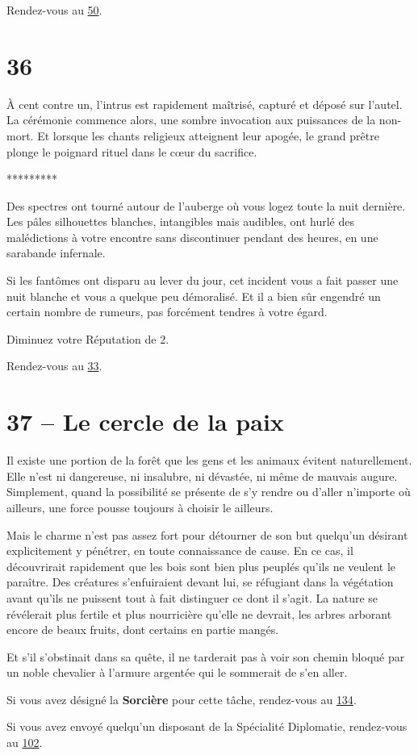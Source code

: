 \documentclass{report}
\newcommand{\gsection}[1]{
    \section{#1}
    \label{section-#1}
}
\newcommand{\glink}[1]{\hyperref[section-#1]{#1}}
\newcommand{\ellipse}{
    \begin{center}
        *********
    \end{center}
}
\newcommand{\hero}[1]{\textbf{#1}}
\begin{document}
Rendez-vous au \glink{50}.

\gsection{36}

À cent contre un, l'intrus est rapidement maîtrisé, capturé et déposé sur l'autel. La cérémonie commence alors, une sombre invocation aux puissances de la non-mort. Et lorsque les chants religieux atteignent leur apogée, le grand prêtre plonge le poignard rituel dans le cœur du sacrifice.

\ellipse

Des spectres ont tourné autour de l'auberge où vous logez toute la nuit dernière. Les pâles silhouettes blanches, intangibles mais audibles, ont hurlé des malédictions à votre encontre sans discontinuer pendant des heures, en une sarabande infernale.

Si les fantômes ont disparu au lever du jour, cet incident vous a fait passer une nuit blanche et vous a quelque peu démoralisé. Et il a bien sûr engendré un certain nombre de rumeurs, pas forcément tendres à votre égard.

Diminuez votre Réputation de 2.

Rendez-vous au \glink{33}.

\gsection{37 – Le cercle de la paix}

Il existe une portion de la forêt que les gens et les animaux évitent naturellement. Elle n'est ni dangereuse, ni insalubre, ni dévastée, ni même de mauvais augure. Simplement, quand la possibilité se présente de s'y rendre ou d'aller n'importe où ailleurs, une force pousse toujours à choisir le ailleurs.

Mais le charme n'est pas assez fort pour détourner de son but quelqu'un désirant explicitement y pénétrer, en toute connaissance de cause. En ce cas, il découvrirait rapidement que les bois sont bien plus peuplés qu'ils ne veulent le paraître. Des créatures s'enfuiraient devant lui, se réfugiant dans la végétation avant qu'ils ne puissent tout à fait distinguer ce dont il s'agit. La nature se révélerait plus fertile et plus nourricière qu'elle ne devrait, les arbres arborant encore de beaux fruits, dont certains en partie mangés.

Et s'il s'obstinait dans sa quête, il ne tarderait pas à voir son chemin bloqué par un noble chevalier à l'armure argentée qui le sommerait de s'en aller.

Si vous avez désigné la \hero{Sorcière} pour cette tâche, rendez-vous au \glink{134}.

Si vous avez envoyé quelqu'un disposant de la Spécialité Diplomatie, rendez-vous au \glink{102}.
\end{document}
